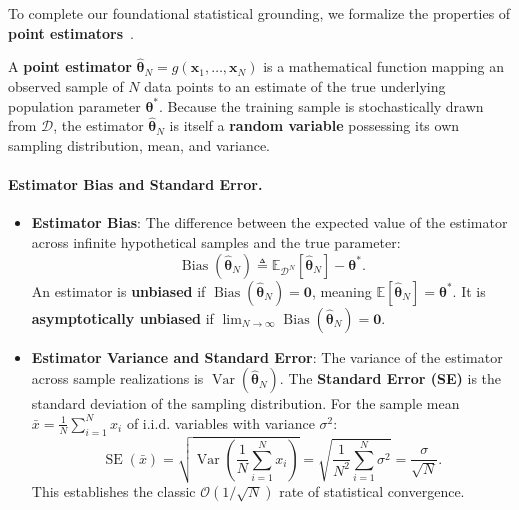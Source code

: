 To complete our foundational statistical grounding, we formalize the properties of \textbf{point estimators}~\cite{goodfellow2016deep,bishop2024deep}. 

A \textbf{point estimator} $\hat{\boldsymbol{\theta}}_N = g(\mathbf{x}_1, \dots, \mathbf{x}_N)$ is a mathematical function mapping an observed sample of $N$ data points to an estimate of the true underlying population parameter $\boldsymbol{\theta}^*$. Because the training sample is stochastically drawn from $\mathcal{D}$, the estimator $\hat{\boldsymbol{\theta}}_N$ is itself a \textbf{random variable} possessing its own sampling distribution, mean, and variance.

\paragraph{Estimator Bias and Standard Error.}
\begin{itemize}[noitemsep]
  \item \textbf{Estimator Bias}: The difference between the expected value of the estimator across infinite hypothetical samples and the true parameter:
  \begin{equation}
  \operatorname{Bias}(\hat{\boldsymbol{\theta}}_N) \triangleq \mathbb{E}_{\mathcal{D}^N}[\hat{\boldsymbol{\theta}}_N] - \boldsymbol{\theta}^*.
  \label{eq:estimator_bias_def}
  \end{equation}
  An estimator is \textbf{unbiased} if $\operatorname{Bias}(\hat{\boldsymbol{\theta}}_N) = \mathbf{0}$, meaning $\mathbb{E}[\hat{\boldsymbol{\theta}}_N] = \boldsymbol{\theta}^*$. It is \textbf{asymptotically unbiased} if $\lim_{N \to \infty} \operatorname{Bias}(\hat{\boldsymbol{\theta}}_N) = \mathbf{0}$.
  \item \textbf{Estimator Variance and Standard Error}: The variance of the estimator across sample realizations is $\operatorname{Var}(\hat{\boldsymbol{\theta}}_N)$. The \textbf{Standard Error (SE)} is the standard deviation of the sampling distribution. For the sample mean $\bar{x} = \frac{1}{N}\sum_{i=1}^N x_i$ of i.i.d. variables with variance $\sigma^2$:
  \begin{equation}
  \operatorname{SE}(\bar{x}) = \sqrt{\operatorname{Var}\left( \frac{1}{N}\sum_{i=1}^N x_i \right)} = \sqrt{\frac{1}{N^2} \sum_{i=1}^N \sigma^2} = \frac{\sigma}{\sqrt{N}}.
  \label{eq:standard_error_formula}
  \end{equation}
  This establishes the classic $\mathcal{O}(1/\sqrt{N})$ rate of statistical convergence.
\end{itemize}

